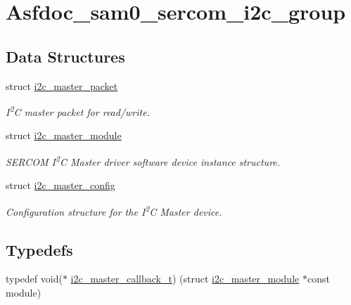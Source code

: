 \hypertarget{group__asfdoc__sam0__sercom__i2c__group}{}\section{Asfdoc\+\_\+sam0\+\_\+sercom\+\_\+i2c\+\_\+group}
\label{group__asfdoc__sam0__sercom__i2c__group}
\subsection*{Data Structures}
\begin{DoxyCompactItemize}
\item 
struct \mbox{\hyperlink{structi2c__master__packet}{i2c\+\_\+master\+\_\+packet}}
\begin{DoxyCompactList}\small\item\em I\textsuperscript{2}C master packet for read/write. \end{DoxyCompactList}\item 
struct \mbox{\hyperlink{structi2c__master__module}{i2c\+\_\+master\+\_\+module}}
\begin{DoxyCompactList}\small\item\em S\+E\+R\+C\+OM I\textsuperscript{2}C Master driver software device instance structure. \end{DoxyCompactList}\item 
struct \mbox{\hyperlink{structi2c__master__config}{i2c\+\_\+master\+\_\+config}}
\begin{DoxyCompactList}\small\item\em Configuration structure for the I\textsuperscript{2}C Master device. \end{DoxyCompactList}\end{DoxyCompactItemize}
\subsection*{Typedefs}
\begin{DoxyCompactItemize}
\item 
typedef void($\ast$ \mbox{\hyperlink{group__asfdoc__sam0__sercom__i2c__group_ga0ef653593dbacc01735c61e59ec3f0da}{i2c\+\_\+master\+\_\+callback\+\_\+t}}) (struct \mbox{\hyperlink{structi2c__master__module}{i2c\+\_\+master\+\_\+module}} $\ast$const module)
\end{DoxyCompactItemize}
